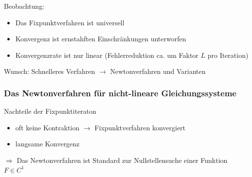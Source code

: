 \documentclass[10pt,a4paper]{article}
\begin{document}
Beobachtung: 
\begin{itemize}
\item Das Fixpunktverfahren ist universell
\item Konvergenz ist ernstahften Einschränkungen unterworfen
\item Konvergenzrate ist nur linear (Fehlerreduktion ca. um Faktor $L$ pro Iteration)
\end{itemize}

Wunsch: Schnelleres Verfahren $\rightarrow$ Newtonverfahren und Varianten



\subsubsection{Das Newtonverfahren für nicht-lineare Gleichungssysteme}

Nachteile der Fixpunktiteraton

\begin{itemize}
\item oft keine Kontraktion $\rightarrow$ Fixpunktverfahren konvergiert
\item langsame Konvergenz
\end{itemize}

$\Rightarrow$ Das Newtonverfahren ist Standard zur Nullstellensuche einer Funktion $F \in C^{1}$
\end{document}
